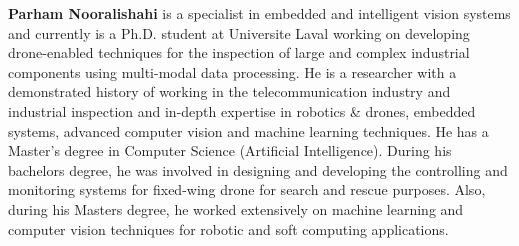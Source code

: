 {\bfseries{Parham Nooralishahi}} is a specialist in embedded and intelligent vision systems and currently is a Ph.\+D. student at Universite Laval working on developing drone-\/enabled techniques for the inspection of large and complex industrial components using multi-\/modal data processing. He is a researcher with a demonstrated history of working in the telecommunication industry and industrial inspection and in-\/depth expertise in robotics \& drones, embedded systems, advanced computer vision and machine learning techniques. He has a Master’s degree in Computer Science (Artificial Intelligence). During his bachelor\textquotesingle{}s degree, he was involved in designing and developing the controlling and monitoring systems for fixed-\/wing drone for search and rescue purposes. Also, during his Master\textquotesingle{}s degree, he worked extensively on machine learning and computer vision techniques for robotic and soft computing applications. 